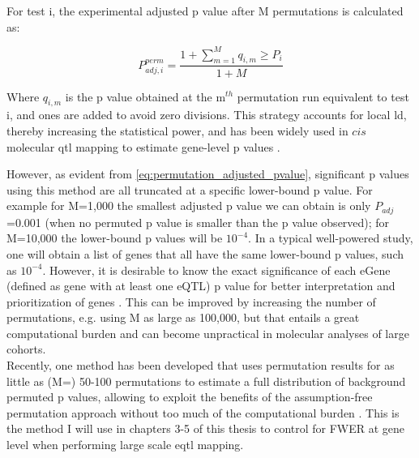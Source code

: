 For test i, the experimental adjusted p value after M permutations is calculated as:

\begin{equation}\label{eq:permutation_adjusted_pvalue}
    P_{adj,i}^{perm} = \frac{1+\sum_{m=1}^{M} q_{i,m} \geq P_i}{1+M}
\end{equation}

Where $q_{i,m}$ is the p value obtained at the m$^{th}$ permutation run equivalent to test i, and ones are added to avoid zero divisions.  
This strategy accounts for local \gls{ld}, thereby increasing the statistical power, and has been widely used in $cis$ molecular \gls{qtl} mapping to estimate gene-level p values \cite{gtex2015genotype}.  


However, as evident from \eqref{eq:permutation_adjusted_pvalue}, significant p values using this method are all truncated at a specific lower-bound p value.
For example for M=1,000 the smallest adjusted p value we can obtain is only $P_{adj}$=0.001 (when no permuted p value is smaller than the p value observed); for M=10,000 the lower-bound p values will be $10^{-4}$. 
In a typical well-powered study, one will obtain a list of genes that all have the same lower-bound p values, such as $10^{-4}$. 
However, it is desirable to know the exact significance of each eGene (defined as gene with at least one eQTL) p value for better interpretation and prioritization of genes \cite{sul2015accurate}.
This can be improved by increasing the number of permutations, e.g. using M as large as 100,000, but that entails a great computational burden and can become unpractical in molecular analyses of large cohorts.\\

Recently, one method has been developed that uses permutation results for as little as (M=) 50-100 permutations to estimate a full distribution of background permuted p values, allowing to exploit the benefits of the assumption-free permutation approach without too much of the computational burden \cite{ongen2016fast}. 
This is the method I will use in chapters 3-5 of this thesis to control for FWER at gene level when performing large scale e\gls{qtl} mapping.

